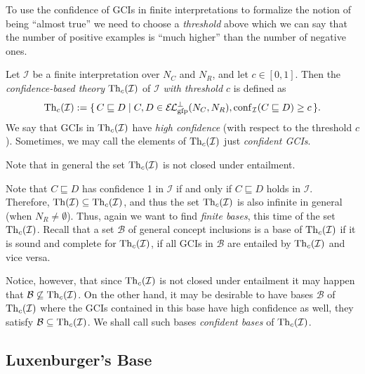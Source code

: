 To use the confidence of GCIs in finite interpretations to formalize the notion of being
\enquote{almost true} we need to choose a \emph{threshold} above which we can say that the
number of positive examples is \enquote{much higher} than the number of negative ones.

\begin{Definition}
  \label{def:confident-theory-of-interpretations}
  Let $\mathcal{I}$ be a finite interpretation over $N_C$ and $N_R$, and let $c \in [0,
  1]$.  Then the \emph{confidence-based theory} $\operatorname{Th}_{c}(\mathcal{I})$ of $\mathcal{I}$
  \emph{with threshold $c$} is defined as
  \begin{equation*}
    \Th_c(\mathcal{I}) := \set{ C \sqsubseteq D \mid C, D \in \ELgfpbot(N_C, N_R),
      \conf_{\mathcal{I}}( C \sqsubseteq D ) \ge c }.
  \end{equation*}
  We say that GCIs in $\operatorname{Th}_c(\mathcal{I})$ have \emph{high confidence} (with respect to
  the threshold $c$).  Sometimes, we may call the elements of $\operatorname{Th}_c(\mathcal{I})$ just
  \emph{confident GCIs}.
\end{Definition}

Note that in general the set $\operatorname{Th}_c(\mathcal{I})$ is not closed under entailment.

Note that $C \sqsubseteq D$ has confidence 1 in $\mathcal{I}$ if and only if $C
\sqsubseteq D$ holds in $\mathcal{I}$.  Therefore, $\operatorname{Th}(\mathcal{I}) \subseteq
\operatorname{Th}_c(\mathcal{I})$, and thus the set $\operatorname{Th}_c(\mathcal{I})$ is also infinite in general
(\ie when $N_R \neq \emptyset$).  Thus, again we want to find \emph{finite bases}, this
time of the set $\operatorname{Th}_c(\mathcal{I})$.  Recall that a set $\mathcal{B}$ of general concept
inclusions is a base of $\operatorname{Th}_c(\mathcal{I})$ if it is sound and complete for
$\operatorname{Th}_c(\mathcal{I})$, \ie if all GCIs in $\mathcal{B}$ are entailed by
$\operatorname{Th}_c(\mathcal{I})$ and vice versa.

Notice, however, that since $\operatorname{Th}_c(\mathcal{I})$ is not closed under entailment it may
happen that $\mathcal{B} \not\subseteq \operatorname{Th}_c(\mathcal{I})$.  On the other hand, it may be
desirable to have bases $\mathcal{B}$ of $\operatorname{Th}_c(\mathcal{I})$ where the GCIs contained in
this base have high confidence as well, \ie they satisfy $\mathcal{B} \subseteq
\operatorname{Th}_c(\mathcal{I})$.  We shall call such bases \emph{confident bases} of
$\operatorname{Th}_c(\mathcal{I})$.

\subsection{Luxenburger's Base}
\label{Luxen-base}

